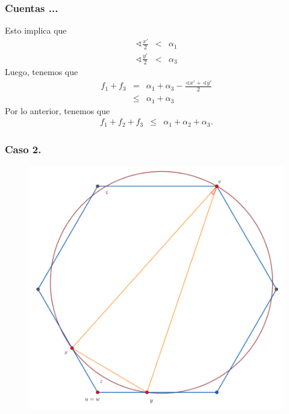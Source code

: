 {\begin{frame}
  \frametitle{Cuentas ...}
  Esto implica que
  \begin{eqnarray*}
    \sphericalangle \frac{x'}{2} &<& \alpha_1\\
    \sphericalangle \frac{y'}{2} &<& \alpha_3
  \end{eqnarray*}
  Luego, tenemos que
 \begin{eqnarray*}
   f_1 + f_3 &=& \alpha_1 + \alpha_3 - \frac{\sphericalangle x' + \sphericalangle y'}{2}\\
             &\leq& \alpha_1 + \alpha_3
 \end{eqnarray*}
 Por lo anterior, tenemos que
 \begin{eqnarray*}
   f_1 + f_2 + f_3 &\leq& \alpha_1 + \alpha_ 2+ \alpha_3.
 \end{eqnarray*}
\end{frame} 

\begin{frame}
  \frametitle{Caso 2.}
  \begin{figure}
    \centering
    \includegraphics[width=.50 \paperwidth]{./images/Bosquejo16.png}
  \end{figure}
\end{frame}

}
